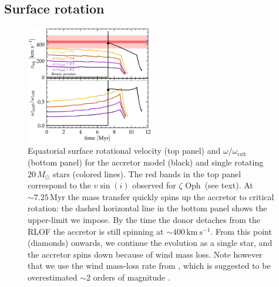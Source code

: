 \documentclass[twocolumn,twocolappendix,trackchanges]{aastex63}
\newcommand{\kms}{{\mathrm{km\ s^{-1}}}}
\newcommand{\zoph}{$\zeta$ Oph}
\begin{document}
\subsection{Surface rotation}
\label{sec:surf_rot}

\begin{figure}[bp]
  \includegraphics[width=0.5\textwidth]{zeta_rot}
  \caption{Equatorial surface rotational velocity (top panel) and
    $\omega/\omega_\mathrm{crit}$ (bottom panel) for the accretor
    model (black) and single rotating $20\,M_\odot$ stars (colored
    lines). The red bands in the top panel correspond to the
    $v\sin(i)$ observed for \zoph\ (see text). At $\sim{}7.25$\,Myr
    the mass transfer quickly spins up the accretor to critical
    rotation: the dashed horizontal line in the bottom panel shows the
    upper-limit we impose. By the time the donor detaches from the
    RLOF the accretor is still spinning at $\sim{}400\,\kms$. From
    this point (diamonds) onwards, we continue the evolution as a
    single star, and the accretor spins down because of wind mass
    loss.  Note however that we use the wind mass-loss rate from
    \cite{vink:00, vink:01}, which is suggested to be overestimated  $\sim$2 orders of magnitude \citep{marcolino:09}.}
  \label{fig:surf_rot}
\end{figure}
\end{document}
